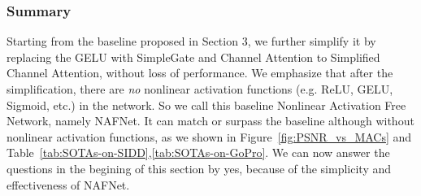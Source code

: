 \documentclass[runningheads]{llncs}
\begin{document}
\subsubsection{Summary}
Starting from the baseline proposed in Section 3, we further simplify it
by replacing the GELU with SimpleGate and Channel Attention to Simplified Channel Attention, without loss of performance.
We emphasize that after the simplification, there are \emph{no} nonlinear activation functions (e.g. ReLU, GELU, Sigmoid, etc.) in the network. So we call this baseline Nonlinear Activation Free Network, namely NAFNet.
It can match or surpass the baseline although without nonlinear activation functions, as we shown in Figure~\ref{fig:PSNR_vs_MACs} and Table~\ref{tab:SOTAs-on-SIDD},\ref{tab:SOTAs-on-GoPro}.
We can now answer the questions in the begining of this section by yes, because of the simplicity and effectiveness of NAFNet. 
\end{document}
